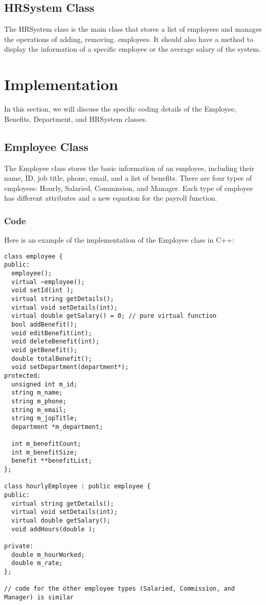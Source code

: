 \documentclass{article}
\begin{document}
\subsection{HRSystem Class}

The HRSystem class is the main class that stores a list of employees and manages the operations of adding, removing. employees. It should also have a method to display the information of a specific employee or the average salary of the system.



\section{Implementation}

In this section, we will discuss the specific coding details of the Employee, Benefits, Department, and HRSystem classes.

\subsection{Employee Class}

The Employee class stores the basic information of an employee, including their name, ID, job title, phone, email, and a list of benefits. There are four types of employees: Hourly, Salaried, Commission, and Manager. Each type of employee has different attributes and a new equation for the payroll function.

\subsubsection{Code}

Here is an example of the implementation of the Employee class in C++:

\begin{verbatim}
class employee {
public:
  employee();
  virtual ~employee();
  void setId(int );
  virtual string getDetails();
  virtual void setDetails(int);
  virtual double getSalary() = 0; // pure virtual function
  bool addBenefit();
  void editBenefit(int);
  void deleteBenefit(int);
  void getBenefit();  
  double totalBenefit();
  void setDepartment(department*);
protected:
  unsigned int m_id;
  string m_name;
  string m_phone;
  string m_email;
  string m_jopTitle;
  department *m_department;

  int m_benefitCount;
  int m_benefitSize;
  benefit **benefitList;
};

class hourlyEmployee : public employee {
public:
  virtual string getDetails();
  virtual void setDetails(int);
  virtual double getSalary();
  void addHours(double );

private:
  double m_hourWorked;
  double m_rate;
};

// code for the other employee types (Salaried, Commission, and Manager) is similar
\end{verbatim}
\end{document}

